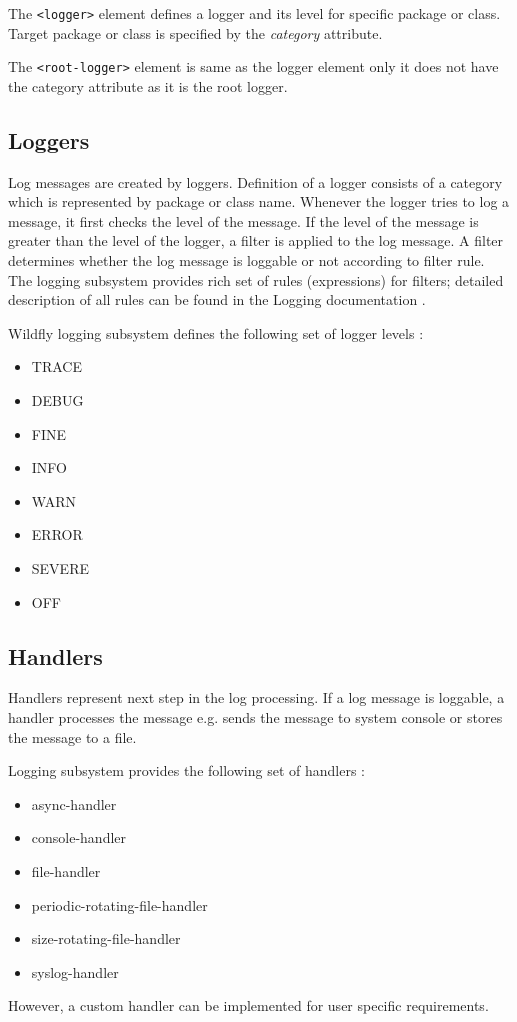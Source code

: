\documentclass[12pt,oneside]{fithesis2}
\begin{document}
The \verb|<logger>| element defines a logger and its level for specific package or class. Target package or class is specified by the \textit{category} attribute.

The \verb|<root-logger>| element is same as the logger element only it does not have the category attribute as it is the root logger.


\subsection{Loggers}
Log messages are created by loggers. Definition of a logger consists of a category which is represented by package or class name. Whenever the logger tries to log a message, it first checks the level of the message. If the level of the message is greater than the level of the logger, a filter is applied to the log message.  A filter determines whether the log message is loggable or not according to filter rule. The logging subsystem provides rich set of rules (expressions) for filters; detailed description of all rules can be found in the Logging documentation \cite[Logging Configuration]{wildfly_doc}.

Wildfly logging subsystem defines the following set of logger levels \cite[Logging Configuration]{wildfly_doc}:

\begin{multicols}{2}
	\begin{itemize}
		\item TRACE
		\item DEBUG
		\item FINE
		\item INFO
		\item WARN
		\item ERROR
		\item SEVERE
		\item OFF
	\end{itemize}
\end{multicols}

\subsection{Handlers}
\label{handlers}
Handlers represent next step in the log processing. If a log message is loggable, a handler processes the message e.g. sends the message to system console or stores the message to a file.

Logging subsystem provides the following set of handlers \cite[Logging Configuration]{wildfly_doc}:
\begin{itemize}
	\item async-handler
	\item console-handler
	\item file-handler
	\item periodic-rotating-file-handler
	\item size-rotating-file-handler
	\item syslog-handler
\end{itemize}
\noindent
However, a custom handler can be implemented for user specific requirements.
\end{document}
